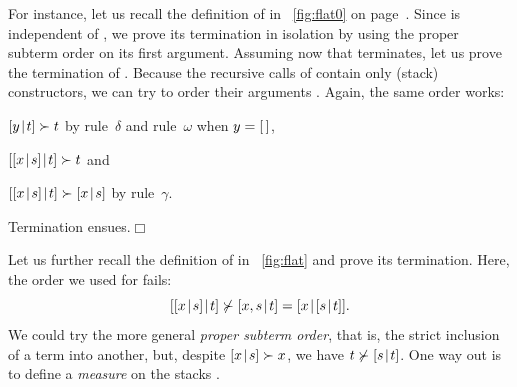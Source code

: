 For instance, let us recall the definition of
 in
\fig~\ref{fig:flat0} on page~\pageref{fig:flat0}. Since
 is independent of
, we prove its termination in isolation by using the
proper subterm order on its first argument. Assuming now that
 terminates, let us prove the termination of
. Because the recursive calls of 
contain only (stack) constructors, we can try to order their arguments
\citep{ArtsGiesl_1996}. Again, the same order works:
\begin{itemize*}

  \item \([{y}\!\mid\!{t}] \succ t\) by rule~\(\delta\) and rule~\(\omega\)
    when \(y=[\,]\),

  \item \([{[{x}\!\mid\!{s}]}\!\mid\!{t}] \succ t\) and

  \item \([{[{x}\!\mid\!{s}]}\!\mid\!{t}] \succ [{x}\!\mid\!{s}]\) by
    rule~\(\gamma\).

\end{itemize*}
Termination ensues.\hfill\(\Box\)

Let us further recall the definition of
 in \fig~\ref{fig:flat} and
prove its termination. Here, the order we used for 
fails:
\begin{equation*}
  \cons{\cons{x}{s}}{t} \nsucc \cons{x,s}{t} =
  \cons{x}{\cons{s}{t}}.
\end{equation*}
We could try the more general \emph{proper subterm
  order}, that is, the strict
inclusion of a term into another, but, despite \([{x}\!\mid\!{s}] \succ
x\), we have \(t \nsucc [{s}\!\mid\!{t}]\). One way out is to define a
\emph{measure} on the stacks
\citep{Giesl_1995a}.


